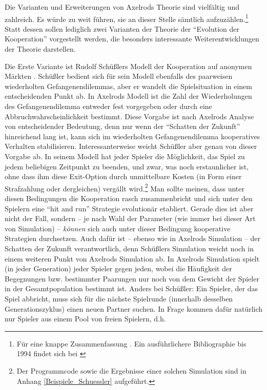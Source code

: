 \documentclass[12pt,a4paper,ngerman]{article}
\begin{document}
Die Varianten und Erweiterungen von Axelrods Theorie sind vielfältig
und zahlreich. Es würde zu weit führen, sie an dieser Stelle sämtlich
aufzuzählen.\footnote{Für eine knappe Zusammenfassung
\cite{hoffmann:2000}. Ein ausführlichere Bibliographie bis 1994 findet
sich bei \cite{axelrod-dambrosio:1994}} Statt dessen sollen lediglich
zwei Varianten der Theorie der "`Evolution der Kooperation"'
vorgestellt werden, die besonders interessante Weiterentwicklungen der
Theorie darstellen.

Die Erste Variante ist Rudolf Schüßlers Modell der Kooperation auf
anonymen Märkten \cite{schuessler:1997}. Schüßler bedient sich für
sein Modell ebenfalls des paarweisen wiederholten Gefangenendilemmas,
aber er wandelt die Spielsituation in einem entscheidenden Punkt ab.
In Axelrods Modell ist die Zahl der Wiederholungen des
Gefangenendilemma entweder fest vorgegeben oder durch eine
Abbruchwahrscheinlichkeit bestimmt. Diese Vorgabe ist nach Axelrods
Analyse von entscheidender Bedeutung, denn nur wenn der "`Schatten der
Zukunft"' hinreichend lang ist, kann sich im wiederholten
Gefangenendilemma kooperatives Verhalten stabilisieren.
Interessanterweise weicht Schüßler aber genau von dieser Vorgabe ab.
In seinem Modell hat jeder Spieler die Möglichkeit, das Spiel zu jedem
beliebigen Zeitpunkt zu beenden, und zwar, was noch erstaunlicher ist,
ohne dass ihm diese Exit-Option durch unmittelbare Kosten (in Form
einer Strafzahlung oder dergleichen) vergällt wird.\footnote{Der
  Programmcode sowie die Ergebnisse einer solchen Simulation sind in
  Anhang \ref{Beispiele_Schuessler} aufgeführt.} Man sollte meinen,
dass unter diesen Bedingungen die Kooperation rasch zusammenbricht und
sich unter den Spielern eine "`hit and run"' Strategie evolutionär
etabliert.  Gerade dies ist aber nicht der Fall, sondern -- je nach
Wahl der Parameter (wie immer bei dieser Art von Simulation) -- {\em
  können} sich auch unter dieser Bedingung kooperative Strategien
durchsetzen. Auch dafür ist -- ebenso wie in Axelrods Simulation --
der Schatten der Zukunft verantwortlich, denn Schüßlers Simulation
weicht noch in einem weiteren Punkt von Axelrods Simulation ab. In
Axelrods Simulation spielt (in jeder Generation) jeder Spieler gegen
jeden, wobei die Häufigkeit der Begegnungen bzw.  bestimmter Paarungen
nur noch von dem Gewicht der Spieler in der Gesamtpopulation bestimmt
ist. Anders bei Schüßler: Ein Spieler, der das Spiel abbricht, muss
sich für die nächste Spielrunde (innerhalb desselben
Generationszyklus) einen neuen Partner suchen. In Frage kommen dafür
natürlich nur Spieler aus einem Pool von freien Spielern, d.h.
\end{document}
